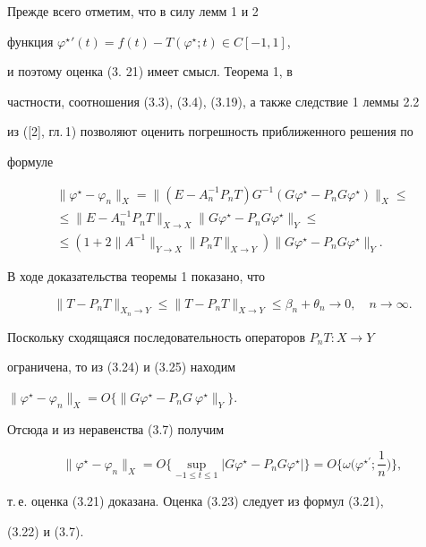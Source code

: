\begin{pf}


Прежде всего отметим, что в силу лемм 1 и 2 


функция $\varphi^{\star}{}'(t)=f(t)-T(\varphi^{\star};t)\in C[-1, 1]$, 


и поэтому оценка (3. 21) имеет смысл. Теорема 1, в


частности, соотношения (3.3), (3.4), (3.19), а также следствие 1 леммы 2.2


из ([2], гл.\,1) позволяют оценить погрешность приближенного решения по


формуле


\begin{multline}


\|\varphi^{\star}-\varphi_n\|_X=\|(E-A_n^{-1}P_nT)G^{-1}(G


\varphi^{\star}-P_nG\varphi^{\star})\|_X\leq\\


\le \| E-A_n^{-1}P_nT


\|_{X\to X}\| G\varphi^{\star}-P_nG\varphi^{\star}\|_Y\leq\\


\leq(1+2\| A^{-1}\|_{Y\to X}\| P_nT\|_{X\to Y})\| G


\varphi^{\star}-P_nG\varphi^{\star}\|_Y. 


\end{multline}


В ходе доказательства теоремы 1 показано, что


\begin{equation}


\| T-P_nT\|_{X_n\to Y}\leq\| T-P_nT\|_{X\to Y}\leq\beta_n


+\theta_n\to 0, \quad n\to\infty. 


\end{equation}


Поскольку сходящаяся последовательность операторов $P_nT:X\to Y$ 


ограничена, то из (3.24) и (3.25) находим


$\|\varphi^{\star}-\varphi_n\|_X=O\{\| G\varphi^{\star}-P_nG\


\varphi^{\star}\|_Y\}$. 





Отсюда и из неравенства (3.7) получим


$$


\|\varphi^{\star}-\varphi_n\|_X=O\Big\{\sup_{-1\leq t\leq 1}| G


\varphi^{\star}-P_nG\varphi^{\star}|\Big\}=


O\bigg\{\omega\bigg(\varphi^{\star'};\frac{1}{n}\bigg)\bigg\}, 


$$


т.\,е. оценка (3.21) доказана. Оценка (3.23) следует из формул (3.21), 


(3.22) и (3.7). 


\end{pf}





